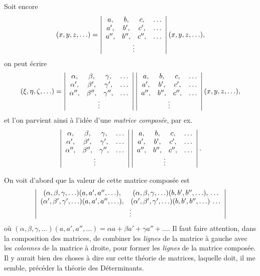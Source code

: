 \documentclass[11pt,a4paper]{article}
\begin{document}
Soit encore
\[
(x,y,z,\ldots) = \left\lvert\begin{array}{cccc}
a , & b , & c , & \ldots\\
a', & b', & c', & \ldots\\
a'', & b'', & c'', & \ldots\\
\multicolumn{4}{c}{\vdots}
\end{array}\right\rvert (x,y,z,\ldots),
\]
on peut \'ecrire
\[
(\xi,\eta,\zeta,\ldots) = \left\lvert\begin{array}{cccc}
\alpha , & \beta , & \gamma , & \ldots\\
\alpha', & \beta', & \gamma', & \ldots\\
\alpha'', & \beta'', & \gamma'', & \ldots\\
\multicolumn{4}{c}{\vdots}
\end{array}\right\rvert \left\lvert\begin{array}{cccc}
a , & b , & c , & \ldots\\
a', & b', & c', & \ldots\\
a'', & b'', & c'', & \ldots\\
\multicolumn{4}{c}{\vdots}
\end{array}\right\rvert (x,y,z,\ldots),
\]
et l'on parvient ainsi \`a l'id\'ee d'une \textit{matrice compos\'ee}, par ex.
\[
\left\lvert\begin{array}{cccc}
\alpha , & \beta , & \gamma , & \ldots\\
\alpha', & \beta', & \gamma', & \ldots\\
\alpha'', & \beta'', & \gamma'', & \ldots\\
\multicolumn{4}{c}{\vdots}
\end{array}\right\rvert \left\lvert\begin{array}{cccc}
a , & b , & c , & \ldots\\
a', & b', & c', & \ldots\\
a'', & b'', & c'', & \ldots\\
\multicolumn{4}{c}{\vdots}
\end{array}\right\rvert .
\]

\medskip

On voit d'abord que la valeur de cette matrice compos\'ee est
\[
\left\lvert\begin{array}{cc}
(\alpha,\beta,\gamma,\ldots)(a,a',a'',\ldots), & (\alpha,\beta,\gamma,\ldots)(b,b',b'',\ldots),\,\ldots\\
(\alpha',\beta',\gamma',\ldots)(a,a',a'',\ldots), & (\alpha',\beta',\gamma',\ldots)(b,b',b'',\ldots)\,\ldots\\
\multicolumn{2}{c}{\vdots}
\end{array}\right\rvert
\]
o\`u $(\alpha,\beta,\gamma,\ldots)(a,a',a'',\ldots) = \alpha a + \beta a' + \gamma a'' + \ldots$. Il faut faire attention, dans la composition des matrices, de combiner les \textit{lignes} de la matrice \`a gauche avec les \textit{colonnes} de la matrice \`a droite, pour former les \textit{lignes} de la matrice compos\'ee. Il y aurait bien des choses \`a dire sur cette th\'eorie de matrices, laquelle doit, il me semble, pr\'ec\'eder la th\'eorie des D\'eterminants.
\end{document}
